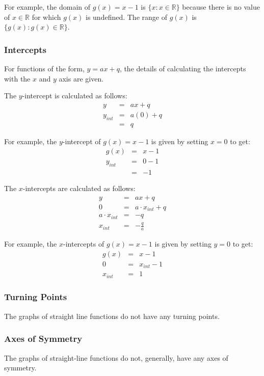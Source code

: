 \documentclass[10pt,a4paper,titlepage,twoside,openright]{report}
\begin{document}
For example, the domain of $g(x)=x-1$ is $\{x:x\in\mathbb{R}\}$ because there is no value of $x \in \mathbb{R}$ for which $g(x)$ is undefined. The range of $g(x)$ is $\{g(x):g(x)\in \mathbb{R}\}$.

\subsubsection{Intercepts}
For functions of the form, $y=ax+q$, the details of calculating the intercepts with the $x$ and $y$ axis are given.

The $y$-intercept is calculated as follows:
\begin{eqnarray}
y&=&ax+q\\
y_{int}&=&a(0)+q\\
&=&q
\end{eqnarray}

For example, the $y$-intercept of $g(x)=x-1$ is given by setting $x=0$ to get:
\begin{eqnarray*}
g(x)&=&x-1\\
y_{int}&=&0-1\\
&=&-1
\end{eqnarray*}

The $x$-intercepts are calculated as follows:
\begin{eqnarray}
y&=&ax+q\\
0&=&a\cdot x_{int} +q\\
a \cdot x_{int}&=&-q\\
x_{int}&=&-\frac{q}{a}
\end{eqnarray}

For example, the $x$-intercepts of $g(x)=x-1$ is given by setting $y=0$ to get:
\begin{eqnarray*}
g(x)&=&x-1\\
0&=&x_{int}-1\\
x_{int}&=&1
\end{eqnarray*}

\subsubsection{Turning Points}
The graphs of straight line functions do not have any turning points.

\subsubsection{Axes of Symmetry}
The graphs of straight-line functions do not, generally, have any axes of symmetry.
\end{document}
